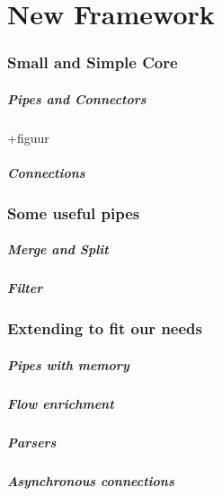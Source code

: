 \chapter{New Framework}

\subsection{Small and Simple Core}

\paragraph{Pipes and Connectors} +figuur

\paragraph{Connections} %

\subsection{Some useful pipes}

\paragraph{Merge and Split}

\paragraph{Filter}

\subsection{Extending to fit our needs}

\paragraph{Pipes with memory} 

\paragraph{Flow enrichment}

\paragraph{Parsers}

\paragraph{Asynchronous connections}

